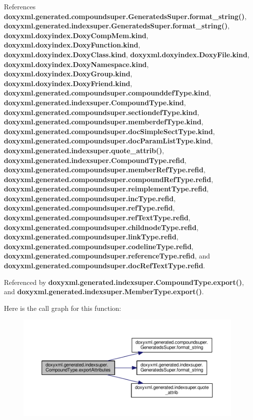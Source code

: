 References {\bf doxyxml.\+generated.\+compoundsuper.\+Generateds\+Super.\+format\+\_\+string()}, {\bf doxyxml.\+generated.\+indexsuper.\+Generateds\+Super.\+format\+\_\+string()}, {\bf doxyxml.\+doxyindex.\+Doxy\+Comp\+Mem.\+kind}, {\bf doxyxml.\+doxyindex.\+Doxy\+Function.\+kind}, {\bf doxyxml.\+doxyindex.\+Doxy\+Class.\+kind}, {\bf doxyxml.\+doxyindex.\+Doxy\+File.\+kind}, {\bf doxyxml.\+doxyindex.\+Doxy\+Namespace.\+kind}, {\bf doxyxml.\+doxyindex.\+Doxy\+Group.\+kind}, {\bf doxyxml.\+doxyindex.\+Doxy\+Friend.\+kind}, {\bf doxyxml.\+generated.\+compoundsuper.\+compounddef\+Type.\+kind}, {\bf doxyxml.\+generated.\+indexsuper.\+Compound\+Type.\+kind}, {\bf doxyxml.\+generated.\+compoundsuper.\+sectiondef\+Type.\+kind}, {\bf doxyxml.\+generated.\+compoundsuper.\+memberdef\+Type.\+kind}, {\bf doxyxml.\+generated.\+compoundsuper.\+doc\+Simple\+Sect\+Type.\+kind}, {\bf doxyxml.\+generated.\+compoundsuper.\+doc\+Param\+List\+Type.\+kind}, {\bf doxyxml.\+generated.\+indexsuper.\+quote\+\_\+attrib()}, {\bf doxyxml.\+generated.\+indexsuper.\+Compound\+Type.\+refid}, {\bf doxyxml.\+generated.\+compoundsuper.\+member\+Ref\+Type.\+refid}, {\bf doxyxml.\+generated.\+compoundsuper.\+compound\+Ref\+Type.\+refid}, {\bf doxyxml.\+generated.\+compoundsuper.\+reimplement\+Type.\+refid}, {\bf doxyxml.\+generated.\+compoundsuper.\+inc\+Type.\+refid}, {\bf doxyxml.\+generated.\+compoundsuper.\+ref\+Type.\+refid}, {\bf doxyxml.\+generated.\+compoundsuper.\+ref\+Text\+Type.\+refid}, {\bf doxyxml.\+generated.\+compoundsuper.\+childnode\+Type.\+refid}, {\bf doxyxml.\+generated.\+compoundsuper.\+link\+Type.\+refid}, {\bf doxyxml.\+generated.\+compoundsuper.\+codeline\+Type.\+refid}, {\bf doxyxml.\+generated.\+compoundsuper.\+reference\+Type.\+refid}, and {\bf doxyxml.\+generated.\+compoundsuper.\+doc\+Ref\+Text\+Type.\+refid}.



Referenced by {\bf doxyxml.\+generated.\+indexsuper.\+Compound\+Type.\+export()}, and {\bf doxyxml.\+generated.\+indexsuper.\+Member\+Type.\+export()}.



Here is the call graph for this function\+:
\nopagebreak
\begin{figure}[H]
\begin{center}
\leavevmode
\includegraphics[width=350pt]{d6/db9/classdoxyxml_1_1generated_1_1indexsuper_1_1CompoundType_ac6e29a09297a1d44eebbf759e82dbf99_cgraph}
\end{center}
\end{figure}




